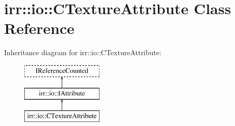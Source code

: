 \hypertarget{classirr_1_1io_1_1_c_texture_attribute}{\section{irr\-:\-:io\-:\-:C\-Texture\-Attribute Class Reference}
\label{classirr_1_1io_1_1_c_texture_attribute}
}
Inheritance diagram for irr\-:\-:io\-:\-:C\-Texture\-Attribute\-:\begin{figure}[H]
\begin{center}
\leavevmode
\includegraphics[height=3.000000cm]{classirr_1_1io_1_1_c_texture_attribute}
\end{center}
\end{figure}
